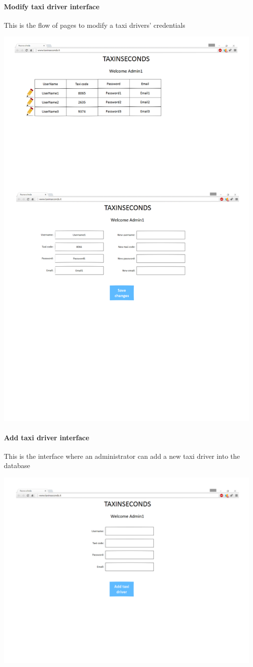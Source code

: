 \documentclass{article}
\begin{document}
\paragraph{Modify taxi driver interface}
This is the flow of pages to modify a taxi drivers' credentials\\ 
\begin{center}
	\includegraphics[width=.8\textwidth,height=.8\textheight,keepaspectratio]{Modifytaxidriver}
\end{center}
\clearpage
\paragraph{Add taxi driver interface}
This is the interface where an administrator can add a new taxi driver into the database\\ 
\begin{center}
	\includegraphics[width=.8\textwidth,height=.8\textheight,keepaspectratio]{Addtaxidriver}
\end{center}
\clearpage
\end{document}
